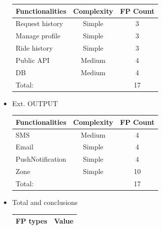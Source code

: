\documentclass[a4paper,11pt]{report} %
\begin{document}
\begin{itemize}
\begin{center}
\begin{tabular}{| p{7cm} | p{2.5cm} | p{2cm} |}
						\textbf{Functionalities} & \multicolumn{1}{|c|}{\textbf{Complexity}} & \textbf{FP Count}\\\hline
						Request history & \multicolumn{1}{|c|}{Simple} & \multicolumn{1}{|c|}{3}\\\hline
						Manage profile & \multicolumn{1}{|c|}{Simple} & \multicolumn{1}{|c|}{3}\\\hline
						Ride history & \multicolumn{1}{|c|}{Simple} & \multicolumn{1}{|c|}{3}\\\hline		
						Public API & \multicolumn{1}{|c|}{Medium} & \multicolumn{1}{|c|}{4}\\\hline	
						DB & \multicolumn{1}{|c|}{Medium} & \multicolumn{1}{|c|}{4}\\\hline		

						\multicolumn{2}{|l|}{Total:} & \multicolumn{1}{|c|}{17}\\\hline
					\end{tabular}
				\end{center}
				\item Ext. OUTPUT
				\renewcommand{\arraystretch}{1.2}
				\setlength{\tabcolsep}{12pt}
				\begin{center}
					\begin{tabular}{| p{7cm} | p{2.5cm} | p{2cm} |}\hline
						\textbf{Functionalities} & \multicolumn{1}{|c|}{\textbf{Complexity}} & \textbf{FP Count}\\\hline
						SMS & \multicolumn{1}{|c|}{Medium} & \multicolumn{1}{|c|}{4}\\\hline
						Email & \multicolumn{1}{|c|}{Simple} & \multicolumn{1}{|c|}{4}\\\hline
						PushNotification & \multicolumn{1}{|c|}{Simple} & \multicolumn{1}{|c|}{4}\\\hline		
						Zone & \multicolumn{1}{|c|}{Simple} & \multicolumn{1}{|c|}{10}\\\hline																						
						\multicolumn{2}{|l|}{Total:} & \multicolumn{1}{|c|}{17}\\\hline
					\end{tabular}
				\end{center}
				\pagebreak
				\item Total and conclusions
				\renewcommand{\arraystretch}{1.2}
				\setlength{\tabcolsep}{12pt}
				\begin{center}
					\begin{tabular}{| p{7cm} | p{2cm} |}\hline
						\textbf{FP types} & \multicolumn{1}{|c|}{\textbf{Value}}\\\hline

\end{tabular}
\end{center}
\end{itemize}
\end{document}

